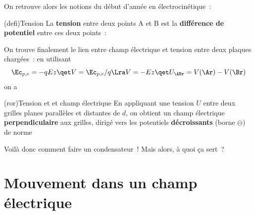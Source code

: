 \documentclass[../../main/main.tex]{subfiles}
\begin{document}
On retrouve alors les notions du début d'année en électrocinétique~:

\begin{tcb*}(defi){Tension}
	La \textbf{tension} entre deux points A et B est la \textbf{différence de
		potentiel} entre ces deux points~:
	\psw{
		\[\boxed{U_{\ABr} = V(\Ar) - V(\Br)}\]
	}
	\vspace{-15pt}
\end{tcb*}

On trouve finalement le lien entre champ électrique et tension entre deux
plaques chargées~: en utilisant
\[
	\Ec_{p,e} = -qEz
	\qet
	V = \Ec_{p,e}/q \Lra V = -Ez
	\qet
	U_{\ABr} = V(\Ar) - V(\Br)
\]
on a
\psw{\[U_{\ABr} = -Ez_\Ar + Ez_\Br = E(z_\Br - z_\Ar) = Ed\]}
\vspace{-15pt}
\begin{tcb*}(ror){Tension et et champ électrique}
	En appliquant une tension $U$ entre deux grilles planes parallèles et
	distantes de $d$, on obtient un champ électrique \textbf{perpendiculaire}
	aux grilles, dirigé vers les potentiels \textbf{décroissants} (borne
	$\ominus$) de norme
	\psw{
		\[\norm{\Ef} = \frac{U}{d}\]
	}
\end{tcb*}

Voilà donc comment faire un condensateur~! Mais alors, à quoi ça sert~?

\section{Mouvement dans un champ électrique}
\end{document}
